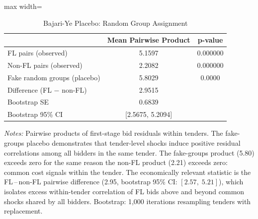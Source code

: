 \begin{table}[htbp]
\centering
\caption{Bajari-Ye Placebo: Random Group Assignment}
\label{tab:bajari_ye_placebo}
\begin{adjustbox}{max width=\textwidth}
\begin{threeparttable}
\small
\begin{tabular}{lcc}
\toprule
 & Mean Pairwise Product & p-value \\
\midrule
FL pairs (observed) & 5.1597 & 0.000000 \\
Non-FL pairs (observed) & 2.2082 & 0.000000 \\
Fake random groups (placebo) & 5.8029 & 0.0000 \\
\midrule
Difference (FL $-$ non-FL) & 2.9515 & \\
Bootstrap SE & 0.6839 & \\
Bootstrap 95\% CI & [2.5675, 5.2094] & \\
\bottomrule
\end{tabular}
\begin{tablenotes}
\small
\item \textit{Notes:} Pairwise products of first-stage bid residuals
within tenders. The fake-groups placebo demonstrates that tender-level
shocks induce positive residual correlations among all bidders in the
same tender. The fake-groups product (5.80) exceeds zero for the same
reason the non-FL product (2.21) exceeds zero: common cost signals
within the tender. The economically relevant statistic is the
FL\,--\,non-FL pairwise difference (2.95, bootstrap 95\% CI:
$[2.57,\; 5.21]$), which isolates excess within-tender correlation
of FL bids above and beyond common shocks shared by all bidders.
Bootstrap: 1,000 iterations resampling tenders with replacement.
\end{tablenotes}
\end{threeparttable}
\end{adjustbox}
\end{table}
